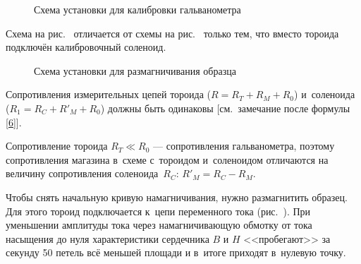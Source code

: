 %

\begin{figure}[h!]
	\caption{Схема установки для калибровки гальванометра}
\end{figure}

Схема на рис.~ отличается от схемы на рис.~ только тем, что вместо тороида подключён калибровочный соленоид.

\begin{wrapfigure}[8]{r}{0.45\textwidth}
	\caption{Схема установки для размагничивания образца}
\end{wrapfigure}

Сопротивления измерительных цепей тороида ($R=R_T+ R_M + R_0$) и~соленоида ($R_1=R_C+R'_M+R_0$) должны быть одинаковы
[см.~замечание после формулы \eqref{6}].

Сопротивление тороида $R_T\ll R_0$ --- сопротивления гальванометра, поэтому сопротивления магазина в~схеме с~тороидом
и~соленоидом отличаются на величину сопротивления соленоида~$R_C$: $R'_M = R_C - R_M$.

Чтобы снять начальную кривую намагничивания, нужно размагнитить образец. Для этого тороид подключается к~цепи
переменного тока (рис.~). При уменьшении амплитуды тока через намагничивающую обмотку от тока насыщения до нуля
характеристики сердечника $B$ и $H$ <<пробегают>> за секунду 50 петель всё меньшей площади и в~итоге приходят в~нулевую
точку.


